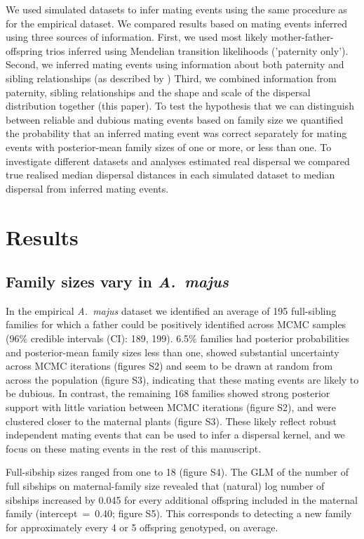 \documentclass[10pt, a4paper, twocolumn]{article} %
\begin{document}
We used simulated datasets to infer mating events using the same procedure as for the empirical dataset.
We compared results based on mating events inferred using three sources of information.
First, we used most likely mother-father-offspring trios inferred using Mendelian transition likelihoods ('paternity only').
Second, we inferred mating events using information about both paternity and sibling relationships (as described by \cite{ellis2018efficient})
Third, we combined information from paternity, sibling relationships and the shape and scale of the dispersal distribution together (this paper).
To test the hypothesis that we can distinguish between reliable and dubious mating events based on family size we quantified the probability that an inferred mating event was correct separately for mating events with posterior-mean family sizes of one or more, or less than one.
To investigate different datasets and analyses estimated real dispersal we compared true realised median dispersal distances in each simulated dataset to median dispersal from inferred mating events.

\section{Results}

\subsection{Family sizes vary in \textit{A.~majus}}

In the empirical \textit{A.~majus} dataset we identified an average of 195 full-sibling families for which a father could be positively identified across MCMC samples (96\% credible intervals (CI): 189, 199).
6.5\% families had posterior probabilities and posterior-mean family sizes less than one, showed substantial uncertainty across MCMC iterations (figures S2) and seem to be drawn at random from across the population (figure S3), indicating that these mating events are likely to be dubious.
In contrast, the remaining 168 families showed strong posterior support with little variation between MCMC iterations (figure S2), and were clustered closer to the maternal plants (figure S3).
These likely reflect robust independent mating events that can be used to infer a dispersal kernel, and we focus on these mating events in the rest of this manuscript.

Full-sibship sizes ranged from one to 18 (figure S4).
The GLM of the number of full sibships on maternal-family size revealed that (natural) log number of sibships increased by 0.045 for every additional offspring included in the maternal family (intercept~=~0.40; figure S5). This corresponds to detecting a new family for approximately every 4 or 5 offspring genotyped, on average.
\end{document}
